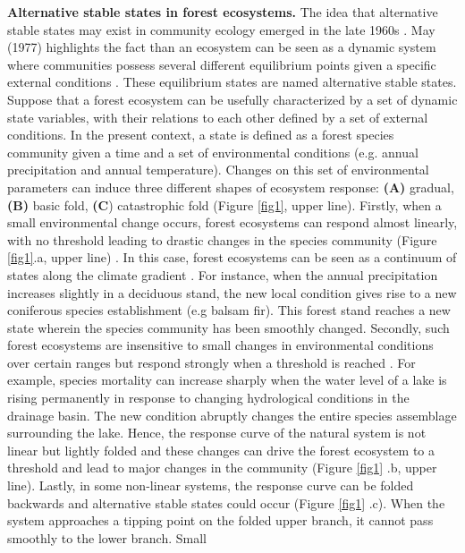 \textbf{Alternative stable states in forest ecosystems.} The idea that
alternative stable states may exist in community ecology emerged in the late
1960s \cite{Scheffer2001,Society2014a}. May (1977) highlights the fact than an
ecosystem can be seen as a dynamic system where communities possess several
different equilibrium points given a specific external conditions
\cite{May1977}. These equilibrium states are named alternative stable states.
Suppose that a forest ecosystem can be usefully characterized by a set of
dynamic state variables, with their relations to each other defined by a set
of external conditions. In the present context, a state is defined as a forest
species community given a time and a set of environmental conditions (e.g.
annual precipitation and annual temperature). Changes on this set of
environmental parameters can induce three different shapes of ecosystem
response: \textbf{(A)} gradual, \textbf{(B)} basic fold, \textbf{(C})
catastrophic fold \cite{Scheffer2001} (Figure \ref{fig1}, upper line).
Firstly, when a small environmental change occurs, forest ecosystems can
respond almost linearly, with no threshold leading to drastic changes in the
species community (Figure \ref{fig1}.a, upper line)
\cite{Scheffer2001,Scheffer2009}. In this case, forest ecosystems can be seen
as a continuum of states along the climate gradient
\cite{Scheffer2001,Scheffer2009,scheffer2009critical}. For instance, when the
annual precipitation increases slightly in a deciduous stand, the new local
condition gives rise to a new coniferous species establishment (e.g balsam
fir). This forest stand reaches a new state wherein the species community has
been smoothly changed. Secondly, such forest ecosystems are insensitive to
small changes in environmental conditions over certain ranges but respond
strongly when a threshold is reached \cite{scheffer2009critical}. For example,
species mortality can increase sharply when the water level of a lake is
rising permanently in response to changing hydrological conditions in the
drainage basin. The new condition abruptly changes the entire species
assemblage surrounding the lake. Hence, the response curve of the natural
system is not linear but lightly folded and these changes can drive the forest
ecosystem to a threshold and lead to major changes in the community (Figure
\ref{fig1} .b, upper line). Lastly, in some non-linear systems, the response
curve can be folded backwards and alternative stable states could occur
(Figure \ref{fig1} .c). When the system approaches a tipping point on the
folded upper branch, it cannot pass smoothly to the lower branch. Small
